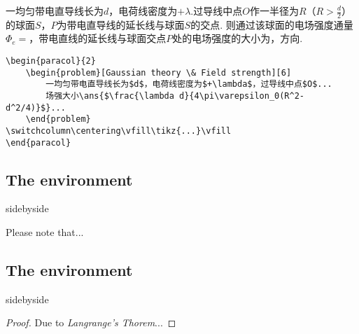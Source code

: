 \begin{paracol}{2}
\begin{problem}
    一均匀带电直导线长为$d$，电荷线密度为$+\lambda$.过导线中点$O$作一半径为$R$（$R>\frac{d}{2}$）的球面$S$，$P$为带电直导线的延长线与球面$S$的交点. 则通过该球面的电场强度通量$\Phi_e=$，带电直线的延长线与球面交点$P$处的电场强度的大小为，方向.
    \end{problem}
\switchcolumn\centering
\vfill
{}
\vfill
\end{paracol}
\begin{tcolorbox}
\begin{verbatim}
\begin{paracol}{2}
    \begin{problem}[Gaussian theory \& Field strength][6]
        一均匀带电直导线长为$d$，电荷线密度为$+\lambda$，过导线中点$O$...
        场强大小\ans{$\frac{\lambda d}{4\pi\varepsilon_0(R^2-d^2/4)}$}...
    \end{problem}
\switchcolumn\centering\vfill\tikz{...}\vfill
\end{paracol}
\end{verbatim}
\end{tcolorbox}

\subsection{The  environment}
\begin{tcblisting}{sidebyside}
\begin{note}
    Please note that...
\end{note}
\end{tcblisting}

\subsection{The  environment}
\begin{tcblisting}{sidebyside}
\begin{proof}
    Due to \emph{Langrange's Thorem}...
\end{proof}
\end{tcblisting}

